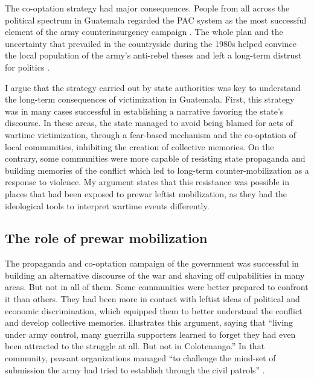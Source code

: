 \documentclass[12pt, notitlepage]{article}
\begin{document}
The co-optation strategy had major consequences.
People from all across the political spectrum in Guatemala regarded the PAC system as the most successful element of the army counterinsurgency campaign \citep{Garrard-Burnett:2010aa}.
The whole plan and the uncertainty that prevailed in the countryside during the 1980s helped convince the local population of the army's anti-rebel theses and left a long-term distrust for politics \citep{Green:1995aa}.

I argue that the strategy carried out by state authorities was key to understand the long-term consequences of victimization in Guatemala.
First, this strategy was in many cases successful in establishing a narrative favoring the state's discourse.
In these areas, the state managed to avoid being blamed for acts of wartime victimization, through a fear-based mechanism and the co-optation of local communities, inhibiting the creation of collective memories.
On the contrary, some communities were more capable of resisting state propaganda and building memories of the conflict which led to long-term counter-mobilization as a response to violence.
My argument states that this resistance was possible in places that had been exposed to prewar leftist mobilization, as they had the ideological tools to interpret wartime events differently.


\subsection*{The role of prewar mobilization}

The propaganda and co-optation campaign of the government was successful in building an alternative discourse of the war and shaving off culpabilities in many areas.
But not in all of them.
Some communities were better prepared to confront it than others.
They had been more in contact with leftist ideas of political and economic discrimination, which equipped them to better understand the conflict and develop collective memories.
\citet[223]{Kobrak:2013aa} illustrates this argument, saying that ``living under army control, many guerrilla supporters learned to forget they had even been attracted to the struggle at all. But not in Colotenango.''
In that community, peasant organizations managed ``to challenge the mind-set of submission the army had tried to establish through the civil patrols'' \citep[226]{Kobrak:2013aa}.
\end{document}
